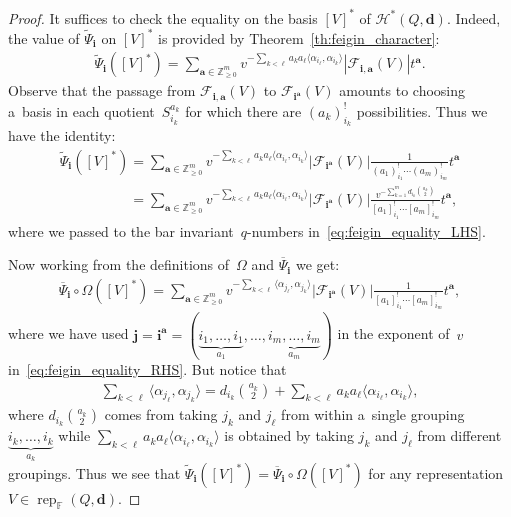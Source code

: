 \documentclass[pdftex]{sigma}
\numberwithin{equation}{section}
\begin{document}
\begin{proof}
It suf\/f\/ices to check the equality on the basis $[V]^*$ of $\mathcal{H}^*(Q,\mathbf{d})$.
Indeed, the value of $\widetilde\Psi_\mathbf{i}$ on $[V]^*$ is provided by Theorem~\ref{th:feigin_character}:
\begin{gather*}
\widetilde\Psi_\mathbf{i}([V]^*)=\sum\limits_{\mathbf{a}\in\mathbb{Z}_{\ge0}^m}v^{-\sum\limits_{k<\ell}
a_ka_\ell\langle\alpha_{i_\ell},\alpha_{i_k}\rangle}|\mathcal{F}_{\mathbf{i},\mathbf{a}}(V)|t^\mathbf{a}.
\end{gather*}
Observe that the passage from $\mathcal{F}_{\mathbf{i},\mathbf{a}}(V)$ to $\mathcal{F}_{\mathbf{i}^\mathbf{a}}(V)$
amounts to choosing a~basis in each quo\-tient~$S_{i_k}^{a_k}$ for which there are $(a_k)_{i_k}^!$ possibilities.
Thus we have the identity:
\begin{gather}
\nonumber
\widetilde\Psi_\mathbf{i}([V]^*)=\sum\limits_{\mathbf{a}\in\mathbb{Z}_{\ge0}^m}v^{-\sum\limits_{k<\ell}
a_ka_\ell\langle\alpha_{i_\ell},\alpha_{i_k}\rangle}|\mathcal{F}_{\mathbf{i}^\mathbf{a}}(V)|\frac{1}{(a_1)_{i_1}^!\cdots(a_m)_{i_m}^!}t^\mathbf{a}
\\
\label{eq:feigin_equality_LHS}
\phantom{\widetilde\Psi_\mathbf{i}([V]^*)}
 =\sum\limits_{\mathbf{a}\in\mathbb{Z}_{\ge0}^m}v^{-\sum\limits_{k<\ell}
a_ka_\ell\langle\alpha_{i_\ell},\alpha_{i_k}\rangle}|\mathcal{F}_{\mathbf{i}^\mathbf{a}}(V)|\frac{v^{-\sum\limits_{k=1}^m
d_{i_k}{a_k\choose 2}}}{[a_1]_{i_1}^!\cdots[a_m]_{i_m}^!}t^\mathbf{a},
\end{gather}
where we passed to the bar invariant~$q$-numbers in~\eqref{eq:feigin_equality_LHS}.

Now working from the def\/initions of~$\Omega$ and $\overline\Psi_\mathbf{i}$ we get:
\begin{gather}
\label{eq:feigin_equality_RHS}
\overline\Psi_\mathbf{i}\circ\Omega([V]^*)
=\sum\limits_{\mathbf{a}\in\mathbb{Z}_{\ge0}^m}v^{-\sum\limits_{k<\ell}\langle\alpha_{j_\ell},\alpha_{j_k}\rangle}
|\mathcal{F}_{\mathbf{i}^\mathbf{a}}(V)|\frac{1}{[a_1]_{i_1}^!\cdots[a_m]_{i_m}^!}t^\mathbf{a},
\end{gather}
where we have used $\mathbf{j}=\mathbf{i}^\mathbf{a}=(\underbrace{i_1,\ldots, i_1}_{a_1},\ldots,\underbrace{i_m,\ldots,i_m}_{a_m})$
in the exponent of~$v$ in~\eqref{eq:feigin_equality_RHS}.
But notice that
\begin{gather*}
\sum\limits_{k<\ell}\langle\alpha_{j_\ell},\alpha_{j_k}\rangle=d_{i_k}{a_k\choose 2}+\sum\limits_{k<\ell}
a_ka_\ell\langle\alpha_{i_\ell},\alpha_{i_k}\rangle,
\end{gather*}
where $d_{i_k}{a_k\choose 2}$ comes from taking $j_k$ and $j_\ell$ from within a~single grouping $\underbrace{i_k,\ldots, i_k}_{a_k}$
while\linebreak %
$\sum\limits_{k<\ell} a_ka_\ell\langle\alpha_{i_\ell},\alpha_{i_k}\rangle$ is obtained by taking $j_k$ and $j_\ell$ from dif\/ferent groupings.
Thus we see that $\widetilde \Psi_\mathbf{i}([V]^*)=\overline\Psi_\mathbf{i}\circ\Omega([V]^*)$ for any representation
$V\in\operatorname{rep}_\mathbb{F}(Q,\mathbf{d})$.
\end{proof}
\end{document}
